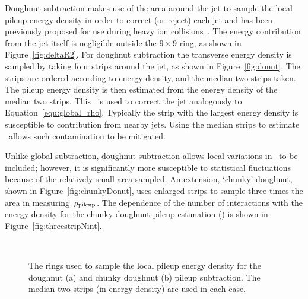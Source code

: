 Doughnut subtraction makes use of the area around the jet to sample the local pileup
energy density in order to correct (or reject) each jet and has been previously proposed
for use during heavy ion collisions~\cite{doughnut}. The energy contribution from the jet
itself is negligible outside the $9\times9$ ring, as shown in Figure~\ref{fig:deltaR2}. 
For doughnut subtraction the transverse energy density is sampled by taking four strips around 
the jet, as shown in Figure~\ref{fig:donut}. The strips are ordered according to energy density,
and the median two strips taken. The pileup energy density is then estimated from the 
energy density of the median two strips. This \rhoD~is used to correct the
jet analogously to Equation~\ref{equ:global_rho}. Typically the strip with the largest
energy density is susceptible to contribution from nearby jets. Using the median 
strips to estimate \rhoP~allows such contamination to be mitigated.

Unlike global subtraction, doughnut subtraction allows local variations in \rhoP~to be 
included; however, it is significantly more susceptible to statistical fluctuations because of the 
relatively small area sampled. An extension, `chunky' doughnut, shown in Figure~\ref{fig:chunkyDonut},
uses enlarged strips to sample three times the area in measuring~$\rho_{\text{pileup}}$. The dependence of the number of interactions
with the energy density for the chunky doughnut pileup estimation (\rhoC) is shown in Figure~\ref{fig:threestripNint}.

\begin{figure}
\hfill
{}~~
\hfill
\caption{The rings used to sample the local pileup energy density for the doughnut (a) and chunky doughnut (b)
pileup subtraction. The median two strips (in energy density) are used in each case.}
\end{figure}

